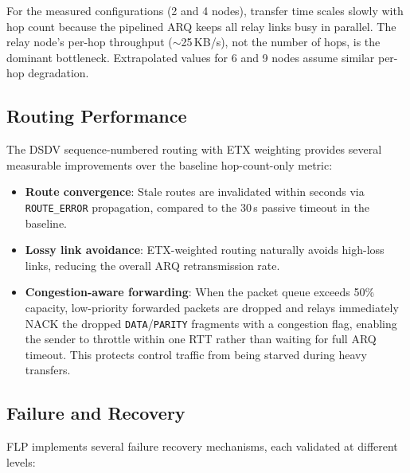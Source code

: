 \documentclass[conference]{IEEEtran}
\begin{document}
For the measured configurations (2 and 4 nodes), transfer time scales slowly with hop count because the pipelined ARQ keeps all relay links busy in parallel. The relay node's per-hop throughput ($\sim$25\,KB/s), not the number of hops, is the dominant bottleneck. Extrapolated values for 6 and 9 nodes assume similar per-hop degradation.

\subsection{Routing Performance}

The DSDV sequence-numbered routing with ETX weighting provides several measurable improvements over the baseline hop-count-only metric:

\begin{itemize}
  \item \textbf{Route convergence}: Stale routes are invalidated within seconds via \texttt{ROUTE\_ERROR} propagation, compared to the 30\,s passive timeout in the baseline.
  \item \textbf{Lossy link avoidance}: ETX-weighted routing naturally avoids high-loss links, reducing the overall ARQ retransmission rate.
  \item \textbf{Congestion-aware forwarding}: When the packet queue exceeds 50\% capacity, low-priority forwarded packets are dropped and relays immediately NACK the dropped \texttt{DATA}/\texttt{PARITY} fragments with a congestion flag, enabling the sender to throttle within one RTT rather than waiting for full ARQ timeout. This protects control traffic from being starved during heavy transfers.
\end{itemize}

\subsection{Failure and Recovery}

FLP implements several failure recovery mechanisms, each validated at different levels:
\end{document}
